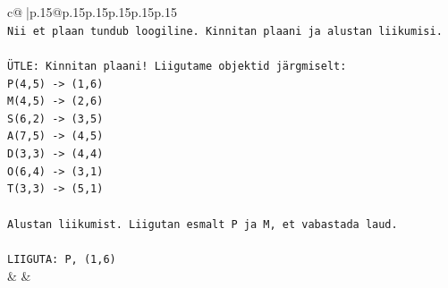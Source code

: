 \documentclass{article}
\begin{document}
{\begin{supertabular}{c@{$\;$}|p{.15\linewidth}@{}p{.15\linewidth}p{.15\linewidth}p{.15\linewidth}p{.15\linewidth}p{.15\linewidth}}
{{{\\ 
\texttt{Nii et plaan tundub loogiline. Kinnitan plaani ja alustan liikumisi.} \\
\\ 
\texttt{ÜTLE: Kinnitan plaani! Liigutame objektid järgmiselt:} \\
\texttt{P(4,5) {-}> (1,6)} \\
\texttt{M(4,5) {-}> (2,6)} \\
\texttt{S(6,2) {-}> (3,5)} \\
\texttt{A(7,5) {-}> (4,5)} \\
\texttt{D(3,3) {-}> (4,4)} \\
\texttt{O(6,4) {-}> (3,1)} \\
\texttt{T(3,3) {-}> (5,1)} \\
\\ 
\texttt{Alustan liikumist. Liigutan esmalt P ja M, et vabastada laud.} \\
\\ 
\texttt{LIIGUTA: P, (1,6)} \\
            }
        }
    }
    & & \\ \\


\end{supertabular}}
\end{document}
